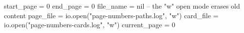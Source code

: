 \begin{luacode*}
    start_page = 0
    end_page = 0
    file_name = nil
    -- the "w" open mode erases old content
    page_file = io.open("page-numbers-paths.log", "w") 
    card_file = io.open("page-numbers-cards.log", "w") 
    current_page = 0
\end{luacode*}


\newcommand{\countpage}{%
    \directlua{
        current_page = current_page + 1
    }
}

\newcommand{\registercard}[2]{%
    \directlua{
        path_name = \luastring{#1}
        card_name = \luastring{#2}
        card_file:write(path_name..' - '..card_name..' - '..current_page..'\string\n')
    }
}


